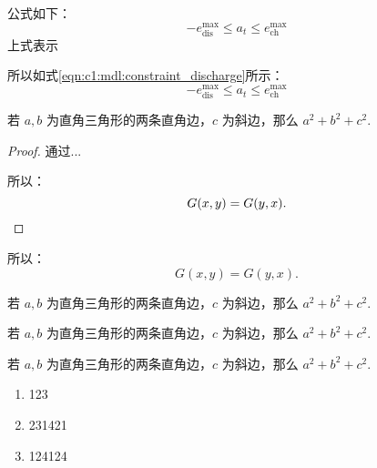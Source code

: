 
公式如下：
\begin{equation}
    -e^{\max}_\text{dis} \leq a_t \leq e^{\max}_\text{ch}\label{eqn:c1:mdl:constraint_discharge}
\end{equation}
上式表示

所以如式\eqref{eqn:c1:mdl:constraint_discharge}所示：
\begin{equation}
    -e^{\max}_\text{dis} \leq a_t \leq e^{\max}_\text{ch}
\end{equation}


\begin{theorem}[勾股定理]
    若 $a,b$ 为直角三角形的两条直角边，$c$ 为斜边，那么 $a^2 + b^2 + c^2.$
\end{theorem}

\begin{proof}
{
    通过...

    所以：
    \begin{equation*}
        G(x, y) = G(y, x).  \qedhere
    \end{equation*}
}
\end{proof}

\begin{proposition}
    所以：
    \begin{equation*}
        G(x, y) = G(y, x).
    \end{equation*}
\end{proposition}


\begin{conjecture}[勾股定理]
    若 $a,b$ 为直角三角形的两条直角边，$c$ 为斜边，那么 $a^2 + b^2 + c^2.$
\end{conjecture}

\begin{axiom}[勾股定理]
    若 $a,b$ 为直角三角形的两条直角边，$c$ 为斜边，那么 $a^2 + b^2 + c^2.$
\end{axiom}

\begin{definition}[勾股定理]
    若 $a,b$ 为直角三角形的两条直角边，$c$ 为斜边，那么 $a^2 + b^2 + c^2.$
\end{definition}




\begin{enumerate}
  \item 123
  \item 231421
  \item 124124
\end{enumerate}

